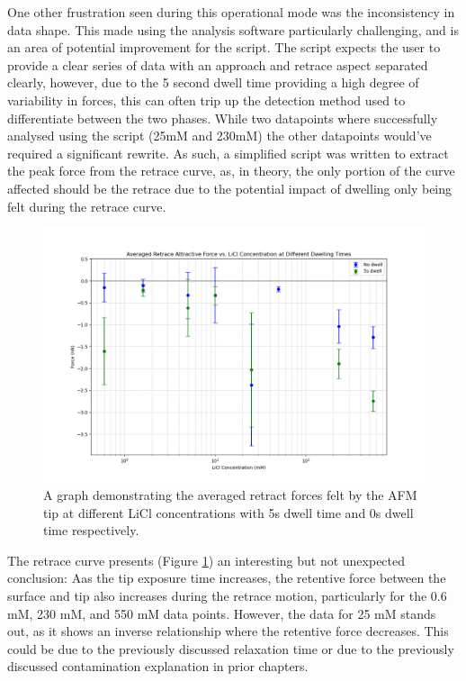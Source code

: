 One other frustration seen during this operational mode was the inconsistency in data shape. This made using the analysis software particularly challenging, and is an area of potential improvement for the script. The script expects the user to provide a clear series of data with an approach and retrace aspect separated clearly, however, due to the 5 second dwell time providing a high degree of variability in forces, this can often trip up the detection method used to differentiate between the two phases. While two datapoints where successfully analysed using the script (25mM and 230mM) the other datapoints would've required a significant rewrite. As such, a simplified script was written to extract the peak force from the retrace curve, as, in theory, the only portion of the curve affected should be the retrace due to the potential impact of dwelling only being felt during the retrace curve.

\begin{figure}[h!]
\centering
\includegraphics[width=\textwidth]{chapter7/Dwell/Retrace overall.png}
\caption{A graph demonstrating the averaged retract forces felt by the AFM tip at different LiCl concentrations with 5s dwell time and 0s dwell time respectively.}
\label{fig:RetractDwell}
\end{figure}

The retrace curve presents (Figure \ref{fig:RetractDwell}) an interesting but not unexpected conclusion: Aas the tip exposure time increases, the retentive force between the surface and tip also increases during the retrace motion, particularly for the 0.6 mM, 230 mM, and 550 mM data points. However, the data for 25 mM stands out, as it shows an inverse relationship where the retentive force decreases. This could be due to the previously discussed relaxation time or due to the previously discussed contamination explanation in prior chapters.

